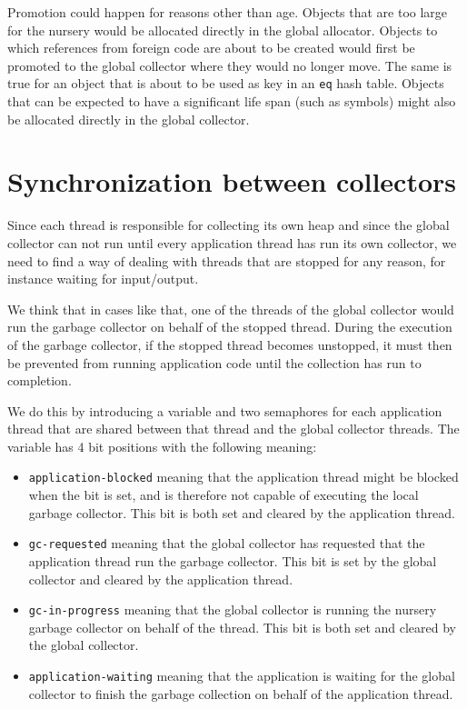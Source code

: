 Promotion could happen for reasons other than age.  Objects that are
too large for the nursery would be allocated directly in the global
allocator.  Objects to which references from foreign code are
about to be created would first be promoted to the global collector
where they would no longer move.  The same is true for an object that
is about to be used as key in an \texttt{eq} hash table.  Objects that
can be expected to have a significant life span (such as symbols)
might also be allocated directly in the global collector. 

\section{Synchronization between collectors}

Since each thread is responsible for collecting its own heap and since
the global collector can not run until every application thread has
run its own collector, we need to find a way of dealing with threads
that are stopped for any reason, for instance waiting for
input/output.

We think that in cases like that, one of the threads of the global
collector would run the garbage collector on behalf of the stopped
thread.  During the execution of the garbage collector, if the stopped
thread becomes unstopped, it must then be prevented from running
application code until the collection has run to completion.

We do this by introducing a variable and two semaphores for each
application thread that are shared between that thread and the global
collector threads.  The variable has 4 bit positions with the
following meaning:

\begin{itemize}
\item \texttt{application-blocked} meaning that the application thread
  might be blocked when the bit is set, and is therefore not capable
  of executing the local garbage collector.  This bit is both set and
  cleared by the application thread.
\item \texttt{gc-requested} meaning that the global collector has
  requested that the application thread run the garbage collector.
  This bit is set by the global collector and cleared by the
  application thread.
\item \texttt{gc-in-progress} meaning that the global collector is
  running the nursery garbage collector on behalf of the thread.  This
  bit is both set and cleared by the global collector.
\item \texttt{application-waiting} meaning that the application is
  waiting for the global collector to finish the garbage collection on
  behalf of the application thread.
\end{itemize}

